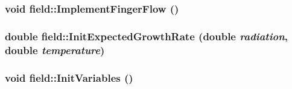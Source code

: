 \label{classfield_a0609f721e5761c23529f1f08f785a264}
\hypertarget{classfield_a1654a805f18f2b50214dcde5dcac2b92}{
\subsubsection[{ImplementFingerFlow}]{\setlength{\rightskip}{0pt plus 5cm}void field::ImplementFingerFlow ()}}
\label{classfield_a1654a805f18f2b50214dcde5dcac2b92}
\hypertarget{classfield_ac93fd3654dbd322021fcd0c92475e39b}{
\subsubsection[{InitExpectedGrowthRate}]{\setlength{\rightskip}{0pt plus 5cm}double field::InitExpectedGrowthRate (double {\em radiation}, \/  double {\em temperature})}}
\label{classfield_ac93fd3654dbd322021fcd0c92475e39b}
\hypertarget{classfield_a001ff179927c8ead0f12d1dc04628ead}{
\subsubsection[{InitVariables}]{\setlength{\rightskip}{0pt plus 5cm}void field::InitVariables ()}}
\label{classfield_a001ff179927c8ead0f12d1dc04628ead}


